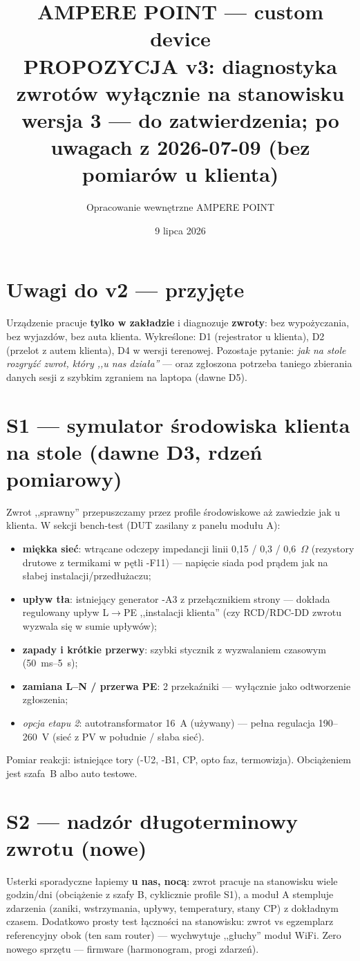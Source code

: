 \documentclass[11pt,a4paper]{article}
\title{\textbf{AMPERE POINT --- custom device}\\[4pt]
\large PROPOZYCJA v3: diagnostyka zwrotów wyłącznie na stanowisku\\[2pt]
\normalsize wersja 3 --- do zatwierdzenia; po uwagach z 2026-07-09 (bez pomiarów u klienta)}
\author{Opracowanie wewnętrzne AMPERE POINT}
\date{9 lipca 2026}
\newcommand{\ohm}{$\Omega$}
\begin{document}
\maketitle
\vspace{-1.4em}

\section{Uwagi do v2 --- przyjęte}
Urządzenie pracuje \textbf{tylko w zakładzie} i diagnozuje \textbf{zwroty}: bez wypożyczania,
bez wyjazdów, bez auta klienta. Wykreślone: D1 (rejestrator u klienta), D2 (przelot z autem
klienta), D4 w wersji terenowej. Pozostaje pytanie: \emph{jak na stole rozgryźć zwrot, który
,,u nas działa''} --- oraz zgłoszona potrzeba taniego zbierania danych sesji z szybkim zgraniem
na laptopa (dawne D5).

\section{S1 --- symulator środowiska klienta na stole (dawne D3, rdzeń pomiarowy)}
Zwrot ,,sprawny'' przepuszczamy przez profile środowiskowe aż zawiedzie jak u klienta. W sekcji
bench-test (DUT zasilany z panelu modułu A):
\begin{itemize}
\item \textbf{miękka sieć}: wtrącane odczepy impedancji linii 0,15 / 0,3 / 0,6~\ohm{} (rezystory
drutowe z termikami w pętli -F11) --- napięcie siada pod prądem jak na słabej instalacji/przedłużaczu;
\item \textbf{upływ tła}: istniejący generator -A3 z przełącznikiem strony --- dokłada regulowany
upływ L$\to$PE ,,instalacji klienta'' (czy RCD/RDC-DD zwrotu wyzwala się w sumie upływów);
\item \textbf{zapady i krótkie przerwy}: szybki stycznik z wyzwalaniem czasowym (50~ms--5~s);
\item \textbf{zamiana L--N / przerwa PE}: 2 przekaźniki --- wyłącznie jako odtworzenie zgłoszenia;
\item \emph{opcja etapu 2}: autotransformator 16~A (używany) --- pełna regulacja 190--260~V
(sieć z PV w południe / słaba sieć).
\end{itemize}
Pomiar reakcji: istniejące tory (-U2, -B1, CP, opto faz, termowizja). Obciążeniem jest szafa~B
albo auto testowe.

\section{S2 --- nadzór długoterminowy zwrotu (nowe)}
Usterki sporadyczne łapiemy \textbf{u nas, nocą}: zwrot pracuje na stanowisku wiele godzin/dni
(obciążenie z szafy B, cyklicznie profile S1), a moduł A stempluje zdarzenia (zaniki, wstrzymania,
upływy, temperatury, stany CP) z dokładnym czasem. Dodatkowo prosty test łączności na stanowisku:
zwrot vs egzemplarz referencyjny obok (ten sam router) --- wychwytuje ,,głuchy'' moduł WiFi.
Zero nowego sprzętu --- firmware (harmonogram, progi zdarzeń).
\end{document}
